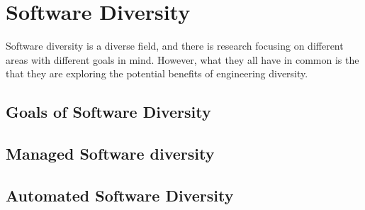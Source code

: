\section{Software Diversity}

Software diversity is a diverse field, and there is research focusing on different areas
with different goals in mind. However, what they all have in common is the that they are
exploring the potential benefits of engineering diversity.


\subsection{Goals of Software Diversity}


\subsection{Managed Software diversity}



\subsection{Automated Software Diversity}


